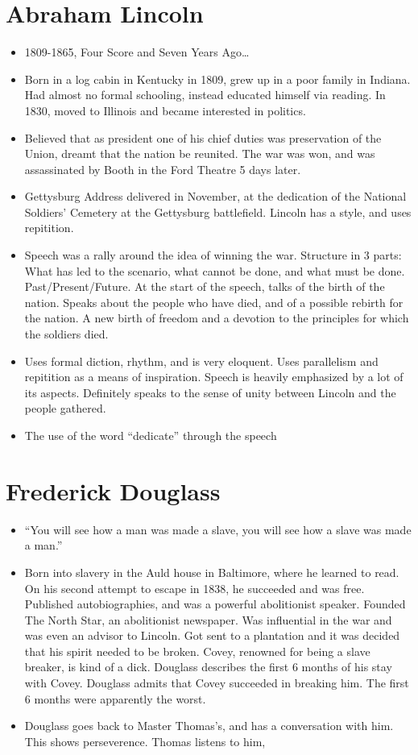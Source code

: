 \documentclass[10pt]{article}
\begin{document}
\section{Abraham Lincoln}
\begin{itemize}
	\item 1809-1865, Four Score and Seven Years Ago\ldots
	\item Born in a log cabin in Kentucky in 1809, grew up in a poor 
		family in Indiana.  Had almost no formal schooling, instead 
		educated himself via reading.  In 1830, moved to Illinois and 
		became interested in politics.
	\item Believed that as president one of his chief duties was 
		preservation of the Union, dreamt that the nation be reunited.  
		The war was won, and was assassinated by Booth in the Ford 
		Theatre 5 days later.  
	\item Gettysburg Address delivered in November, at the dedication of 
		the National Soldiers' Cemetery at the Gettysburg battlefield.  
		Lincoln has a style, and uses repitition.
	\item Speech was a rally around the idea of winning the war.  
		Structure in 3 parts: What has led to the scenario, what 
		cannot be done, and what must be done.  Past/Present/Future.  
		At the start of the speech, talks of the birth of the nation.  
		Speaks about the people who have died, and of a possible 
		rebirth for the nation.  A new birth of freedom and a devotion 
		to the principles for which the soldiers died.
	\item Uses formal diction, rhythm, and is very eloquent.  Uses 
		parallelism and repitition as a means of inspiration.  Speech 
		is heavily emphasized by a lot of its aspects.  Definitely 
		speaks to the sense of unity between Lincoln and the people gathered.
	\item The use of the word ``dedicate'' through the speech
	\end{itemize}
\section{Frederick Douglass}
\begin{itemize}
	\item ``You will see how a man was made a slave, you will see how a 
		slave was made a man.''
	\item Born into slavery in the Auld house in Baltimore, where he 
		learned to read.  On his second attempt to escape in 1838, he 
		succeeded and was free.  Published autobiographies, and was a 
		powerful abolitionist speaker.  Founded The North Star, an 
		abolitionist newspaper.  Was influential in the war and was 
		even an advisor to Lincoln.  Got sent to a plantation and it 
		was decided that his spirit needed to be broken.  Covey, 
		renowned for being a slave breaker, is kind of a dick.  
		Douglass describes the first 6 months of his stay with Covey.  
		Douglass admits that Covey succeeded in breaking him.  The 
		first 6 months were apparently the worst.
	\item Douglass goes back to Master Thomas's, and has a conversation 
		with him.  This shows perseverence.  Thomas listens to him, 
\end{itemize}
\end{document}
